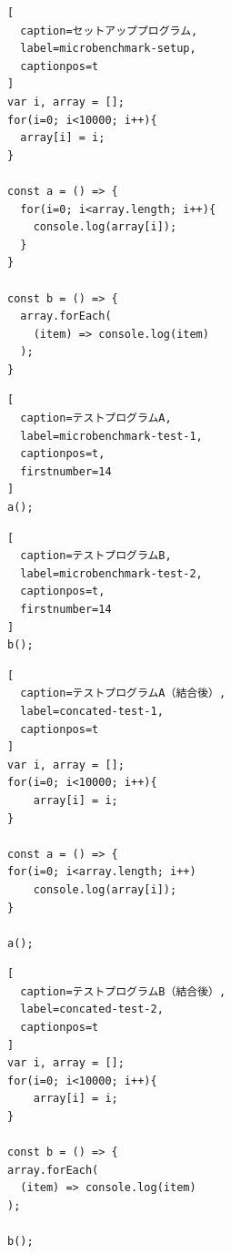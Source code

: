 \documentclass[11pt]{jreport}
\begin{document}
\begin{figure}[t]
\captionsetup{name=Listing}
\hspace{0.04\columnwidth}
\begin{minipage}[b]{0.96\linewidth}
\begin{lstlisting}[
  caption=セットアッププログラム,
  label=microbenchmark-setup,
  captionpos=t
]
var i, array = [];
for(i=0; i<10000; i++){
  array[i] = i;
}

const a = () => {
  for(i=0; i<array.length; i++){
    console.log(array[i]);
  }
}

const b = () => {
  array.forEach(
    (item) => console.log(item)
  );
}
\end{lstlisting}
\end{minipage}

\hspace{0.04\columnwidth}
\begin{minipage}[b]{0.445\linewidth}
\begin{lstlisting}[
  caption=テストプログラムA,
  label=microbenchmark-test-1,
  captionpos=t,
  firstnumber=14
]
a();
\end{lstlisting}
\end{minipage}
\hspace{0.059\columnwidth}
\begin{minipage}[b]{0.445\linewidth}
\begin{lstlisting}[
  caption=テストプログラムB,
  label=microbenchmark-test-2,
  captionpos=t,
  firstnumber=14
]
b();
\end{lstlisting}
\end{minipage}
\end{figure}


\begin{figure}[t]
\captionsetup{name=Listing}
\hspace{0.04\columnwidth}
\begin{minipage}[b]{0.445\linewidth}
\begin{lstlisting}[
  caption=テストプログラムA（結合後）,
  label=concated-test-1,
  captionpos=t
]
var i, array = [];
for(i=0; i<10000; i++){
    array[i] = i;
}

const a = () => {
for(i=0; i<array.length; i++)
    console.log(array[i]);
}

a();
\end{lstlisting}
\end{minipage}
\hspace{0.059\columnwidth}
\begin{minipage}[b]{0.445\linewidth}
\begin{lstlisting}[
  caption=テストプログラムB（結合後）,
  label=concated-test-2,
  captionpos=t
]
var i, array = [];
for(i=0; i<10000; i++){
    array[i] = i;
}

const b = () => {
array.forEach(
  (item) => console.log(item)
);

b();
\end{lstlisting}
\end{minipage}
\end{figure}
\end{document}
